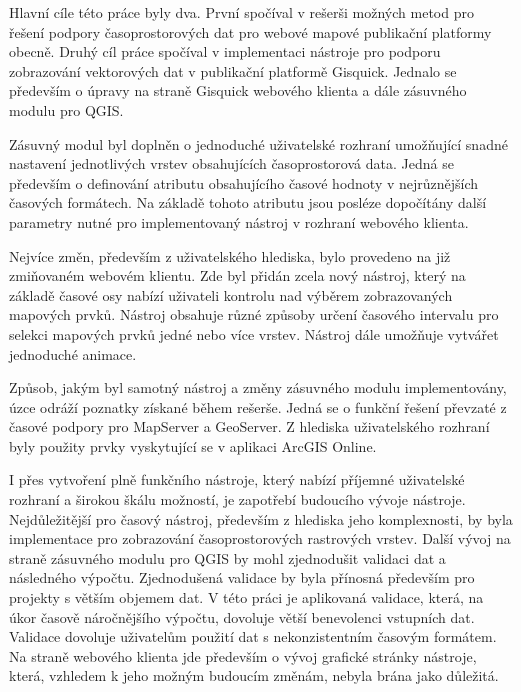 \newpage
{}

Hlavní cíle této práce byly dva. První spočíval v rešerši možných
metod pro řešení podpory časoprostorových dat pro webové mapové
publikační platformy obecně. Druhý cíl práce spočíval v implementaci
nástroje pro podporu zobrazování vektorových dat v publikační
platformě Gisquick. Jednalo se především o úpravy na straně Gisquick
webového klienta a dále zásuvného modulu pro QGIS.

Zásuvný modul byl doplněn o jednoduché uživatelské rozhraní umožňující
snadné nastavení jednotlivých vrstev obsahujících časoprostorová
data. Jedná se především o definování atributu obsahujícího časové
hodnoty v nejrůznějších časových formátech. Na základě tohoto atributu
jsou posléze dopočítány další parametry nutné pro implementovaný
nástroj v rozhraní webového klienta.

Nejvíce změn, především z uživatelského hlediska, bylo provedeno na již
zmiňovaném webovém klientu. Zde byl přidán zcela nový nástroj, který
na základě časové osy nabízí uživateli kontrolu nad výběrem
zobrazovaných mapových prvků. Nástroj obsahuje různé způsoby určení
časového intervalu pro selekci mapových prvků jedné nebo více
vrstev. Nástroj dále umožňuje vytvářet jednoduché animace.

Způsob, jakým byl samotný nástroj a změny zásuvného modulu
implementovány, úzce odráží poznatky získané během rešerše. Jedná se o
funkční řešení převzaté z časové podpory pro MapServer a
GeoServer. Z hlediska
uživatelského rozhraní byly použity prvky
vyskytující se v aplikaci ArcGIS Online.

I přes vytvoření plně funkčního nástroje, který nabízí příjemné
uživatelské rozhraní a širokou škálu možností, je zapotřebí budoucího
vývoje nástroje. Nejdůležitější pro časový nástroj, především z
hlediska jeho komplexnosti, by byla implementace pro zobrazování
časoprostorových rastrových vrstev. Další vývoj na straně zásuvného modulu
pro QGIS by mohl zjednodušit validaci dat a následného výpočtu. 
Zjednodušená validace by byla přínosná především pro projekty s 
větším objemem dat. V
této práci je aplikovaná validace, která, na úkor časově
náročnějšího výpočtu, dovoluje větší benevolenci vstupních dat. Validace dovoluje 
uživatelům použití dat s nekonzistentním
časovým formátem. Na straně webového klienta jde především o vývoj grafické
stránky nástroje, která, vzhledem k jeho možným budoucím změnám, nebyla
brána jako důležitá.

